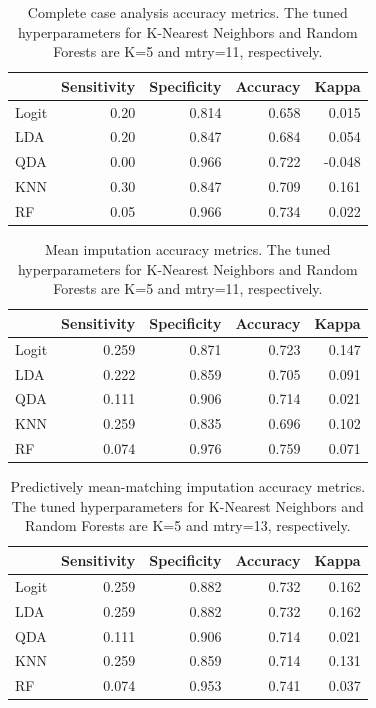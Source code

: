 \documentclass[12pt,]{article}
\begin{document}
\begin{table}[!h]

\caption{\label{tab:unnamed-chunk-3}\label{tab:cc-metrics} Complete case analysis accuracy metrics.  The tuned hyperparameters for K-Nearest Neighbors and Random Forests are K=5 and mtry=11, respectively.}
\centering
\fontsize{10}{12}\selectfont
\begin{tabular}{lrrrr}
\toprule
  & Sensitivity & Specificity & Accuracy & Kappa\\
\midrule
Logit & 0.20 & 0.814 & 0.658 & 0.015\\
LDA & 0.20 & 0.847 & 0.684 & 0.054\\
QDA & 0.00 & 0.966 & 0.722 & -0.048\\
KNN & 0.30 & 0.847 & 0.709 & 0.161\\
RF & 0.05 & 0.966 & 0.734 & 0.022\\
\bottomrule
\end{tabular}
\end{table}

\begin{table}[!h]

\caption{\label{tab:unnamed-chunk-4}\label{tab:mean-metrics} Mean imputation accuracy metrics.  The tuned hyperparameters for K-Nearest Neighbors and Random Forests are K=5 and mtry=11, respectively.}
\centering
\fontsize{10}{12}\selectfont
\begin{tabular}{lrrrr}
\toprule
  & Sensitivity & Specificity & Accuracy & Kappa\\
\midrule
Logit & 0.259 & 0.871 & 0.723 & 0.147\\
LDA & 0.222 & 0.859 & 0.705 & 0.091\\
QDA & 0.111 & 0.906 & 0.714 & 0.021\\
KNN & 0.259 & 0.835 & 0.696 & 0.102\\
RF & 0.074 & 0.976 & 0.759 & 0.071\\
\bottomrule
\end{tabular}
\end{table}

\begin{table}[!h]

\caption{\label{tab:unnamed-chunk-5}\label{tab:pmm-metrics} Predictively mean-matching imputation accuracy metrics.  The tuned hyperparameters for K-Nearest Neighbors and Random Forests are K=5 and mtry=13, respectively.}
\centering
\fontsize{10}{12}\selectfont
\begin{tabular}{lrrrr}
\toprule
  & Sensitivity & Specificity & Accuracy & Kappa\\
\midrule
Logit & 0.259 & 0.882 & 0.732 & 0.162\\
LDA & 0.259 & 0.882 & 0.732 & 0.162\\
QDA & 0.111 & 0.906 & 0.714 & 0.021\\
KNN & 0.259 & 0.859 & 0.714 & 0.131\\
RF & 0.074 & 0.953 & 0.741 & 0.037\\
\bottomrule
\end{tabular}
\end{table}
\end{document}
